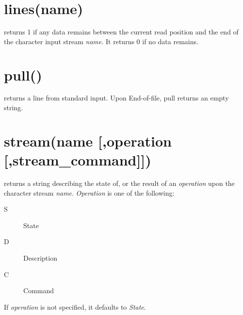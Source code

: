 \section{lines(name)}
returns 1 if any data remains between the current read position and the end of the character input
stream \emph{name}. It returns 0 if no data remains.

\section{pull()}
returns a line from standard input. Upon End-of-file, pull returns an empty string.

\section{stream(name [,operation [,stream\_command{]]})}
returns a string describing the state of, or the result of an \emph{operation}
upon the character stream \emph{name}.
\emph{Operation} is one of the following:
\begin{description}
  \item[S] State
  \item[D] Description
  \item[C] Command
\end{description}
If \emph{operation} is not specified, it defaults to \emph{State}.

